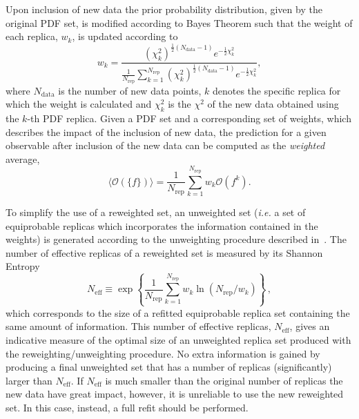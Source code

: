 Upon inclusion of new data the prior probability distribution, given by the original PDF set, is modified according
to Bayes Theorem such that the weight of each replica, $w_k$, is updated according to
\begin{equation}
 w_k = \frac{(\chi^2_k)^{\frac{1}{2} (N_{\mathrm{data}}-1) } e^{-\frac{1}{2}\chi^2_k}}
          { \frac{1}{N_{\mathrm{rep}}} \sum^{N_{\mathrm{rep}}}_{k=1}(\chi^2_k)^{\frac{1}{2}(N_{\mathrm{data}}-1)} e^{-\frac{1}{2}\chi^2_k}  },
\end{equation}
where $N_{\mathrm{data}}$ is the number of new data points, $k$ denotes the specific replica for which the 
weight is calculated and $\chi^2_k$ is the $\chi^2$ of the new data obtained using the $k$-th PDF replica.
Given a PDF set and a corresponding set of weights, which describes the impact of the
inclusion of new data, the prediction for a given observable after inclusion of the new data can be computed as the {\em weighted} average,
\begin{equation}
\langle\mathcal{O}(\{f\})\rangle =  \frac{1}{N_{\mathrm{rep}}} \sum_{k=1}^{N_{\mathrm{rep}}} w_k \mathcal{O}(f^{k}).
\end{equation}

To simplify the use of a reweighted set, an unweighted set ({\em i.e.} a set of equiprobable replicas which incorporates 
the information contained in the weights) is generated according to the unweighting procedure described in~\cite{Ball:2011gg}. 
The number of effective replicas of a reweighted set is measured by its Shannon 
Entropy~\cite{Ball:2010gb}
\begin{equation}
\label{eq:shannon}
N_\mathrm{eff}\equiv 
\exp\left\{\frac{1}{N_\mathrm{rep}}\sum_{k=1}^{N_\mathrm{rep}}w_k\ln(N_\mathrm{rep}/w_k)\right\}\,,
\end{equation}
which corresponds to the size of a refitted equiprobable replica set containing the same amount of information. 
This number of effective replicas, $N_\mathrm{eff}$, gives an indicative measure of the optimal size of an 
unweighted replica set produced with the reweighting/unweighting procedure. No extra information is 
gained by producing a final unweighted set that has a number of replicas (significantly) larger than 
$N_\mathrm{eff}$.  If $N_\mathrm{eff}$ is much smaller than the original number of replicas the new data have great impact, however, it is unreliable to use the new reweighted set. In this case, instead, a full refit should be performed.

